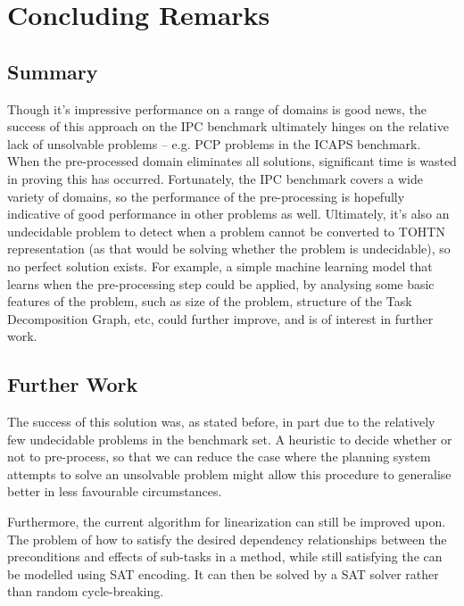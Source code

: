 \chapter{Concluding Remarks}\label{chap:conclusion}

\section{Summary}

Though it's impressive performance on a range of domains is good news, the success of this approach on the IPC benchmark ultimately hinges on the relative lack of unsolvable problems --
e.g. PCP problems in the ICAPS benchmark. When the pre-processed domain eliminates all solutions, significant time is wasted in proving this has occurred. Fortunately, the IPC benchmark covers a wide variety of domains, so the performance of the pre-processing is hopefully indicative of good performance in other problems as well. Ultimately, it's also an undecidable problem to detect when a problem cannot be converted to TOHTN representation (as that would be solving whether the problem is undecidable), so no perfect solution exists. For example, a simple machine learning model that learns when the pre-processing step could be applied, by analysing some basic features of the problem, such as size of the problem, structure of the Task Decomposition Graph, etc, could further improve, and is of interest in further work.

\section{Further Work}


The success of this solution was, as stated before, in part due to the relatively few undecidable problems in the benchmark set. A heuristic to decide whether or not to pre-process, so that we can reduce the case where the planning system attempts to solve an unsolvable problem might allow this procedure to generalise better in less favourable circumstances. 

Furthermore, the current algorithm for linearization can still be improved upon. The problem of how to satisfy the desired dependency relationships between the preconditions and effects of sub-tasks in a method, while still satisfying the can be modelled using SAT encoding. It can then be solved by a SAT solver rather than random cycle-breaking.

